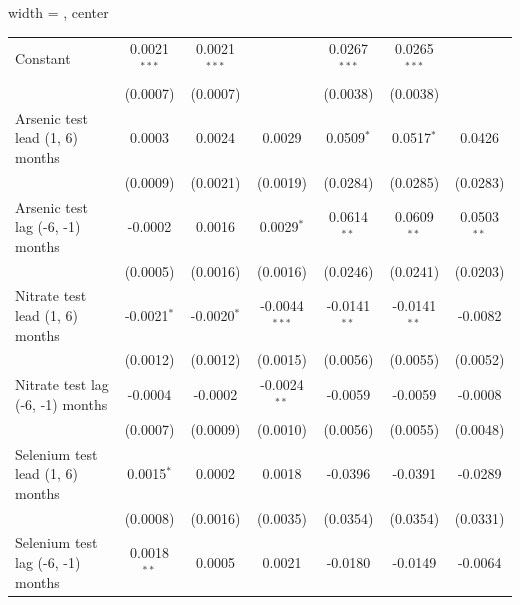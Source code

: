 \begin{table}[htbp]
\begin{adjustbox}{width = \textwidth, center}
\begin{tabular}{lcccccc}
         \midrule 
         Constant                               & 0.0021$^{***}$ & 0.0021$^{***}$         &                 & 0.0267$^{***}$  & 0.0265$^{***}$  &   \\   
                                                & (0.0007)       & (0.0007)               &                 & (0.0038)        & (0.0038)        &   \\   
         Arsenic test lead (1, 6) months        & 0.0003         & 0.0024                 & 0.0029          & 0.0509$^{*}$    & 0.0517$^{*}$    & 0.0426\\   
                                                & (0.0009)       & (0.0021)               & (0.0019)        & (0.0284)        & (0.0285)        & (0.0283)\\   
         Arsenic test lag (-6, -1) months       & -0.0002        & 0.0016                 & 0.0029$^{*}$    & 0.0614$^{**}$   & 0.0609$^{**}$   & 0.0503$^{**}$\\   
                                                & (0.0005)       & (0.0016)               & (0.0016)        & (0.0246)        & (0.0241)        & (0.0203)\\   
         Nitrate test lead (1, 6) months        & -0.0021$^{*}$  & -0.0020$^{*}$          & -0.0044$^{***}$ & -0.0141$^{**}$  & -0.0141$^{**}$  & -0.0082\\   
                                                & (0.0012)       & (0.0012)               & (0.0015)        & (0.0056)        & (0.0055)        & (0.0052)\\   
         Nitrate test lag (-6, -1) months       & -0.0004        & -0.0002                & -0.0024$^{**}$  & -0.0059         & -0.0059         & -0.0008\\   
                                                & (0.0007)       & (0.0009)               & (0.0010)        & (0.0056)        & (0.0055)        & (0.0048)\\   
         Selenium test lead (1, 6) months       & 0.0015$^{*}$   & 0.0002                 & 0.0018          & -0.0396         & -0.0391         & -0.0289\\   
                                                & (0.0008)       & (0.0016)               & (0.0035)        & (0.0354)        & (0.0354)        & (0.0331)\\   
         Selenium test lag (-6, -1) months      & 0.0018$^{**}$  & 0.0005                 & 0.0021          & -0.0180         & -0.0149         & -0.0064\\   

\end{tabular}
\end{adjustbox}
\end{table}
